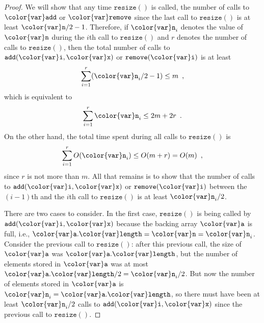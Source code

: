\documentclass[10pt]{book}
\theoremstyle{plain}
\theoremstyle{definition}
\begin{document}
\begin{proof}
  We will show that any time \ensuremath{\mathtt{resize()}} is called, the number of calls
  to \ensuremath{\mathtt{{\color{var}add}}} or \ensuremath{\mathtt{{\color{var}remove}}} since the last call to \ensuremath{\mathtt{resize()}} is at least
  $\ensuremath{\mathtt{{\color{var}n}}}/2-1$.  Therefore, if $\ensuremath{\mathtt{{\color{var}n}}}_i$ denotes the value of \ensuremath{\mathtt{{\color{var}n}}} during the
  $i$th call to \ensuremath{\mathtt{resize()}} and $r$ denotes the number of calls to
  \ensuremath{\mathtt{resize()}}, then the total number of calls to \ensuremath{\mathtt{add({\color{var}i},{\color{var}x})}} or
  \ensuremath{\mathtt{remove({\color{var}i})}} is at least
  \[
     \sum_{i=1}^{r} (\ensuremath{\mathtt{{\color{var}n}}}_i/2-1) \le m  \enspace ,
  \]
  which is equivalent to
  \[
    \sum_{i=1}^{r} \ensuremath{\mathtt{{\color{var}n}}}_i \le 2m + 2r  \enspace .
  \]
  On the other hand, the total time spent during all calls to \ensuremath{\mathtt{resize()}} is 
  \[
     \sum_{i=1}^{r} O(\ensuremath{\mathtt{{\color{var}n}}}_i) \le O(m+r) = O(m)  \enspace ,
  \]
  since $r$ is not more than $m$.  All that remains is to show that the
  number of calls to \ensuremath{\mathtt{add({\color{var}i},{\color{var}x})}} or \ensuremath{\mathtt{remove({\color{var}i})}} between the $(i-1)$th
  and the $i$th call to \ensuremath{\mathtt{resize()}} is at least $\ensuremath{\mathtt{{\color{var}n}}}_i/2$.

  There are two cases to consider. In the first case, \ensuremath{\mathtt{resize()}} is
  being called by \ensuremath{\mathtt{add({\color{var}i},{\color{var}x})}} because the backing array \ensuremath{\mathtt{{\color{var}a}}} is full, i.e.,
  $\ensuremath{\mathtt{{\color{var}a}.{\color{var}length}}} = \ensuremath{\mathtt{{\color{var}n}}}=\ensuremath{\mathtt{{\color{var}n}}}_i$.  Consider the previous call to \ensuremath{\mathtt{resize()}}:
  after this previous call, the size of \ensuremath{\mathtt{{\color{var}a}}} was \ensuremath{\mathtt{{\color{var}a}.{\color{var}length}}}, but the
  number of elements stored in \ensuremath{\mathtt{{\color{var}a}}} was at most $\ensuremath{\mathtt{{\color{var}a}.{\color{var}length}}}/2=\ensuremath{\mathtt{{\color{var}n}}}_i/2$.
  But now the number of elements stored in \ensuremath{\mathtt{{\color{var}a}}} is $\ensuremath{\mathtt{{\color{var}n}}}_i=\ensuremath{\mathtt{{\color{var}a}.{\color{var}length}}}$,
  so there must have been at least $\ensuremath{\mathtt{{\color{var}n}}}_i/2$ calls to \ensuremath{\mathtt{add({\color{var}i},{\color{var}x})}} since
  the previous call to \ensuremath{\mathtt{resize()}}.
  

\end{proof}
\end{document}
